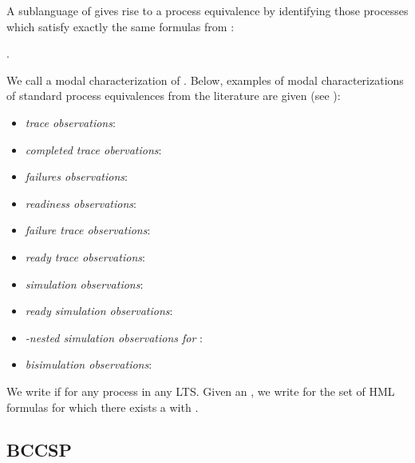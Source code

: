 \documentclass{eptcs}
\begin{document}
A sublanguage  of  gives rise to a process equivalence by identifying those processes which satisfy exactly the same formulas from :
\begin{center}
.
\end{center}
We call  a  modal characterization of . Below, examples of modal characterizations of standard process equivalences from the literature are given (see \cite{Gla01}):
\begin{itemize}
	\item \textit{trace observations}:\\
	 
	\item \textit{completed trace obervations}:\\
	 
	\item \textit{failures observations}:\\
	 
  \item \textit{readiness observations}:\\	 
	
	\item \textit{failure trace observations}:\\	 
	
	\item \textit{ready trace observations}:\\	
	
	\item \textit{simulation observations}:\\	
	
	\item \textit{ready simulation observations}:\\	 
	
	\item \textit{-nested simulation observations for }:\\	 
	
	\item \textit{ bisimulation observations}:\\
	
	\end{itemize}

\vspace{2mm}
We write  if  for any process  in any LTS.
Given an , we write  for the set of HML formulas  for which there
exists a  with .


\subsection{BCCSP}
\end{document}
